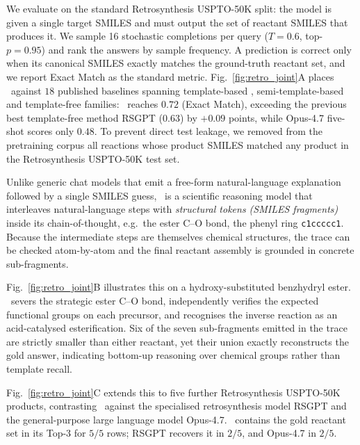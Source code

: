 We evaluate on the standard Retrosynthesis USPTO-50K \citep{schneider2016big} split: the model is given a single target SMILES and must output the set of reactant SMILES that produces it. We sample 16 stochastic completions per query ($T{=}0.6$, top-$p{=}0.95$) and rank the answers by sample frequency. A prediction is correct only when its canonical SMILES exactly matches the ground-truth reactant set, and we report Exact Match as the standard metric. Fig.~\ref{fig:retro_joint}A places \projName~against $18$ published baselines spanning template-based \citep{coley2017computer,segler2017neural,dai2019retrosynthesis,chen2021deep,yan2022retrocomposer}, semi-template-based \citep{shi2020graph,yan2020retroxpert,wang2021retroprime,chen2023g,gao2022semiretro,zhong2023retrosynthesis} and template-free \citep{zheng2019predicting,sacha2021molecule,tu2022permutation,zhong2022root,yao2024node,deng2025rsgpt,opus47} families: \projName~reaches \textbf{$0.72$} (Exact Match), exceeding the previous best template-free method RSGPT \citep{deng2025rsgpt} ($0.63$) by $+0.09$ points, while Opus-4.7 five-shot scores only $0.48$. 
To prevent direct test leakage, we removed from the pretraining corpus all reactions whose product SMILES matched any product in the Retrosynthesis USPTO-50K test set. 

Unlike generic chat models that emit a free-form natural-language explanation followed by a single SMILES guess, \projName~is a scientific reasoning model that interleaves natural-language steps with \emph{structural tokens (SMILES fragments)} inside its chain-of-thought, e.g.\ the ester C--O bond, the phenyl ring \texttt{c1ccccc1}. Because the intermediate steps are themselves chemical structures, the trace can be checked atom-by-atom and the final reactant assembly is grounded in concrete sub-fragments.

Fig.~\ref{fig:retro_joint}B illustrates this on a hydroxy-substituted benzhydryl ester. \projName~severs the strategic ester C--O bond, independently verifies the expected functional groups on each precursor, and recognises the inverse reaction as an acid-catalysed esterification. Six of the seven sub-fragments emitted in the trace are strictly smaller than either reactant, yet their union exactly reconstructs the gold answer, indicating bottom-up reasoning over chemical groups rather than template recall.

Fig.~\ref{fig:retro_joint}C extends this to five further Retrosynthesis USPTO-50K products, contrasting \projName~against the specialised retrosynthesis model RSGPT and the general-purpose large language model Opus-4.7. \projName~contains the gold reactant set in its Top-3 for $5/5$ rows; RSGPT recovers it in $2/5$, and Opus-4.7 in $2/5$.

